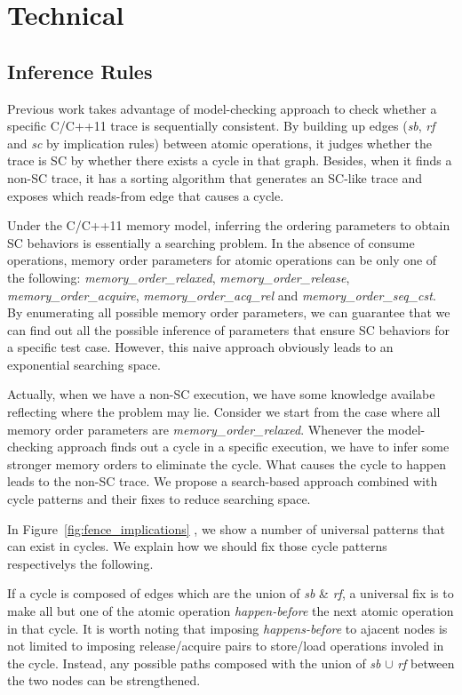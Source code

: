 \section{Technical}\label{sec:technical}

\subsection{Inference Rules}
Previous work takes advantage of model-checking approach to check whether a
specific C/C++11 trace is sequentially consistent. By building up edges
(\textit{sb}, \textit{rf} and \textit{sc} by implication rules) between atomic
operations, it judges whether the trace is SC by whether there exists a cycle in
that graph. Besides, when it finds a non-SC trace, it has a sorting algorithm
that generates an SC-like trace and exposes which reads-from edge that causes a
cycle.

Under the C/C++11 memory model, inferring the ordering parameters to obtain SC
behaviors is essentially a searching problem. In the absence of consume
operations, memory order parameters for atomic operations can be only one of the
following: \textit{memory\_order\_relaxed}, \textit{memory\_order\_release},
\textit{memory\_order\_acquire}, \textit{memory\_order\_acq\_rel} and
\textit{memory\_order\_seq\_cst}. By enumerating all possible memory order
parameters, we can guarantee that we can find out all the possible inference of
parameters that ensure SC behaviors for a specific test case. However, this
naive approach obviously leads to an exponential searching space.

Actually, when we have a non-SC execution, we have some knowledge availabe
reflecting where the problem may lie. Consider we start from the case where all
memory order parameters are \textit{memory\_order\_relaxed}. Whenever the
model-checking approach finds out a cycle in a specific execution, we have to
infer some stronger memory orders to eliminate the cycle. What causes the cycle
to happen leads to the non-SC trace. We propose a search-based approach combined
with cycle patterns and their fixes to reduce searching space.

In Figure~\ref{fig:fence_implications} , we show a number of universal patterns
that can exist in cycles. We explain how we should fix those cycle patterns
respectivelys the following.

 If a cycle is composed of
edges which are the union of \textit{sb} \& \textit{rf}, a universal fix is to
make all but one of the atomic operation \textit{happen-before} the next atomic
operation in that cycle. It is worth noting that imposing
\textit{happens-before} to ajacent nodes is not limited to imposing
release/acquire pairs to store/load operations involed in the cycle. Instead,
any possible paths composed with the union of \textit{sb} $\cup$ \textit{rf}
between the two nodes can be strengthened.


